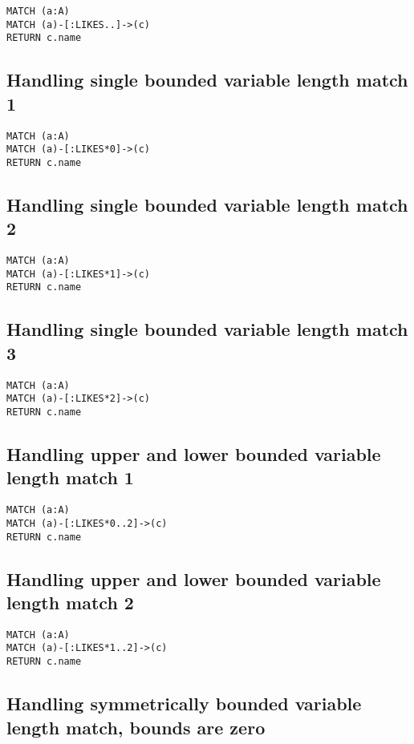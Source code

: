 \begin{lstlisting}
MATCH (a:A)
MATCH (a)-[:LIKES..]->(c)
RETURN c.name
\end{lstlisting}

\subsection{Handling single bounded variable length match 1}

\begin{lstlisting}
MATCH (a:A)
MATCH (a)-[:LIKES*0]->(c)
RETURN c.name
\end{lstlisting}

\subsection{Handling single bounded variable length match 2}

\begin{lstlisting}
MATCH (a:A)
MATCH (a)-[:LIKES*1]->(c)
RETURN c.name
\end{lstlisting}

\subsection{Handling single bounded variable length match 3}

\begin{lstlisting}
MATCH (a:A)
MATCH (a)-[:LIKES*2]->(c)
RETURN c.name
\end{lstlisting}

\subsection{Handling upper and lower bounded variable length match 1}

\begin{lstlisting}
MATCH (a:A)
MATCH (a)-[:LIKES*0..2]->(c)
RETURN c.name
\end{lstlisting}

\subsection{Handling upper and lower bounded variable length match 2}

\begin{lstlisting}
MATCH (a:A)
MATCH (a)-[:LIKES*1..2]->(c)
RETURN c.name
\end{lstlisting}

\subsection{Handling symmetrically bounded variable length match, bounds are zero}


